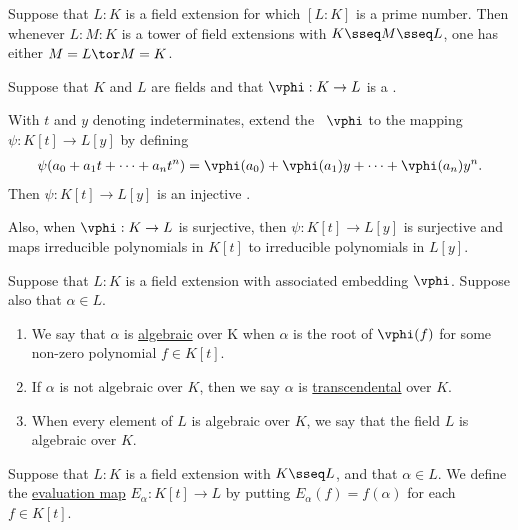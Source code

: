 \documentclass{article}
\begin{document}
  \begin{tcorollary}
    Suppose that \( L:K \) is a field extension for which \( [L: K] \) is a prime number.
    Then whenever \( L : M : K \) is a tower of field extensions with \( K \sseq M \sseq L \), one has either \( M= L \tor M= K \).
  \end{tcorollary}

  \begin{tproposition}
    Suppose that \( K \) and \( L \) are fields and that \( \vphi : K \to L \) is a \homo.

    With \( t \) and \( y \) denoting indeterminates, extend the \homo~\( \vphi \) to the mapping \( \psi: K[t] \to L[y] \) by defining \begin{align*}
      \psi(a_0 + a_1t+\cdots + a_n t^n) = \vphi(a_0) + \vphi(a_1)y+\cdots + \vphi(a_n)y^n.
    \end{align*}
    Then \( \psi:K[t]\to L[y] \) is an injective \homo.

    Also, when \( \vphi:K\to L \) is surjective, then \( \psi: K[t]\to L[y] \) is surjective and maps irreducible polynomials in \( K[t] \) to irreducible polynomials in \( L[y] \).
  \end{tproposition}

  \begin{tdefinition}
    Suppose that \( L: K \) is a field extension with associated embedding \( \vphi \).
    Suppose also that \( \alpha\in L \).
\begin{enumerate}[label=(\roman*)]
      \item We say that \( \alpha \) is \ul{algebraic} over K when \( \alpha \) is the root of \( \vphi(f) \) for some non-zero polynomial \( f \in K[t] \).
      \item If \( \alpha \) is not algebraic over \( K \), then we say \( \alpha \) is \ul{transcendental} over \( K \).
      \item When every element of \( L \) is algebraic over \( K \), we say that the field \( L \) is algebraic over \( K \).
    \end{enumerate}
  \end{tdefinition}

  \begin{tdefinition}
    Suppose that \( L: K \) is a field extension with \( K \sseq L \), and that \( \alpha\in L \).
    We define the \ul{evaluation map} \( E_\alpha : K[t] \to L \) by putting \( E_\alpha(f) = f(\alpha) \) for each \( f \in K[t] \).
  \end{tdefinition}
\end{document}
